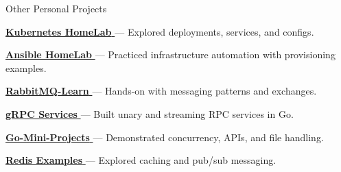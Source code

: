 \begin{cventries}
  \cventry
    {Other Personal Projects}
    {}
    {}
    {}
    {
      \begin{cvitems}
        \item {\href{https://github.com/nmdra/K8s-Learn}{\textbf{Kubernetes HomeLab} \faGithub} — Explored deployments, services, and configs.}
        \item {\href{https://github.com/nmdra/Ansible-Learn}{\textbf{Ansible HomeLab} \faGithub} — Practiced infrastructure automation with provisioning examples.}
        \item {\href{https://github.com/nmdra/RabbitMQ-Learn}{\textbf{RabbitMQ-Learn} \faGithub} — Hands-on with messaging patterns and exchanges.}
        \item {\href{https://github.com/nmdra/gRPC-Learn}{\textbf{gRPC Services} \faGithub} — Built unary and streaming RPC services in Go.}
        \item {\href{https://github.com/nmdra/Go-Mini-Projects}{\textbf{Go-Mini-Projects} \faGithub} — Demonstrated concurrency, APIs, and file handling.}
        \item {\href{https://github.com/nmdra/Redis-Learn}{\textbf{Redis Examples} \faGithub} — Explored caching and pub/sub messaging.}
      \end{cvitems}
    }

\end{cventries}
